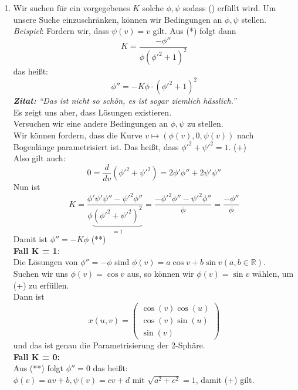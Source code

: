 \begin{solution}
\begin{enumerate}[label= (\alph*)]
    \item 
    Wir suchen für ein vorgegebenes \( K \) solche \( \phi, \psi \) sodass (\*) erfüllt wird. Um unsere Suche einzuschränken, können wir Bedingungen an \( \phi, \psi \) stellen. \\
    \emph{Beispiel}: Fordern wir, dass \( \psi(v) = v \) gilt. Aus (*) folgt dann 
    \begin{equation*}
      K = \frac{-\phi''}{\phi{(\phi'^2 + 1)}^2}
    \end{equation*} 
    das heißt:
    \begin{equation*}
      \phi'' = -K \phi \cdot {(\phi'^2 + 1)}^2
    \end{equation*} 
    \emph{\textbf{Zitat:}} \emph{``Das ist nicht so schön, es ist sogar ziemlich hässlich.''} \\
    Es zeigt uns aber, dass Lösungen existieren. \\
    Versuchen wir eine andere Bedingungen an \( \phi, \psi \) zu stellen. \\
    Wir können fordern, dass die Kurve \( v \mapsto (\phi(v), 0, \psi(v)) \) nach Bogenlänge parametrisiert ist. Das heißt, dass \( \phi'^2 + \psi'^2 = 1 \). (+)\\
    Also gilt auch:
    \begin{equation*}
      0 = \frac{d}{dv}(\phi'^2 + \psi'^2) = 2 \phi'\phi'' + 2 \psi' \psi''
    \end{equation*}
    Nun ist 
    \begin{equation*}
      K = \frac{\phi' \psi' \psi'' - \psi'^2 \phi''}{\phi\underbrace{{(\phi'^2 + \psi'^2)}^2}_{= 1}} = \frac{-\phi'^2 \phi'' - \psi'^2 \phi''}{\phi} = \frac{-\phi''}{\phi}
    \end{equation*}
    Damit ist \( \phi'' = -K \phi \) (**) \\
    \textbf{Fall K = 1}: \\
    Die Lösungen von \( \phi'' = - \phi \) sind \( \phi(v) = a \cos v + b \sin v (a,b \in \mathbb{R}) \). \\
    Suchen wir uns \( \phi(v) = \cos v \) aus, so können wir \( \phi(v) = \sin v \) wählen, um (+) zu erfüllen. \\
    Dann ist
    \begin{equation*}
      x(u,v) = \begin{pmatrix}
        \cos(v) \cos(u) \\
        \cos(v) \sin(u) \\
        \sin(v) 
      \end{pmatrix}
    \end{equation*}
    und das ist genau die Parametrisierung der 2-Sphäre. \\
    \textbf{Fall K = 0:} \\
    Aus (**) folgt \( \phi'' = 0 \) das heißt: \\
    \( \phi(v) = av + b, \psi(v) = cv + d \) mit \( \sqrt{ a^2 + c^2} = 1 \), damit (+) gilt. \\
    

\end{enumerate}
\end{solution}
